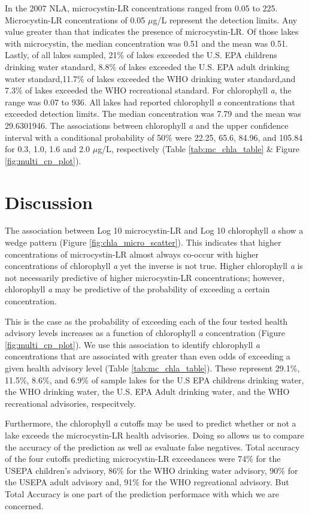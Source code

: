 \documentclass[11pt,]{article}
\begin{document}
In the 2007 NLA, microcystin-LR concentrations ranged from 0.05 to 225.
Microcystin-LR concentrations of 0.05 \(\mu\)g/L represent the detection
limits. Any value greater than that indicates the presence of
microcystin-LR. Of those lakes with microcystin, the median
concentration was 0.51 and the mean was 0.51. Lastly, of all lakes
sampled, 21\% of lakes exceeded the U.S. EPA childrens drinking water
standard, 8.8\% of lakes exceeded the U.S. EPA adult drinking water
standard,11.7\% of lakes exceeded the WHO drinking water standard,and
7.3\% of lakes exceeded the WHO recreational standard. For chlorophyll
\emph{a}, the range was 0.07 to 936. All lakes had reported chlorophyll
\emph{a} concentrations that exceeded detection limits. The median
concentration was 7.79 and the mean was 29.6301946. The associations
between chlorophyll \emph{a} and the upper confidence interval with a
conditional probability of 50\% were 22.25, 65.6, 84.96, and 105.84 for
0.3, 1.0, 1.6 and 2.0 \(\mu\)g/L, respectively (Table
\ref{tab:mc_chla_table} \& Figure \ref{fig:multi_cp_plot}).

\section{Discussion}\label{discussion}

The association between Log 10 microcystin-LR and Log 10 chlorophyll
\emph{a} show a wedge pattern (Figure \ref{fig:chla_micro_scatter}).
This indicates that higher concentrations of microcystin-LR almost
always co-occur with higher concentrations of chlorophyll \emph{a} yet
the inverse is not true. Higher chlorophyll \emph{a} is not necessarily
predictive of higher microcystin-LR concentrations; however, chlorophyll
\emph{a} may be predictive of the probability of exceeding a certain
concentration.

This is the case as the probability of exceeding each of the four tested
health advisory levels increases as a function of chlorophyll \emph{a}
concentration (Figure \ref{fig:multi_cp_plot}). We use this association
to identify chlorophyll \emph{a} concentrations that are associated with
greater than even odds of exceeding a given health advisory level (Table
\ref{tab:mc_chla_table}). These represent 29.1\%, 11.5\%, 8.6\%, and
6.9\% of sample lakes for the U.S EPA childrens drinking water, the WHO
drinking water, the U.S. EPA Adult drinking water, and the WHO
recreational advisories, respecitvely.

Furthermore, the chlorophyll \emph{a} cutoffs may be used to predict
whether or not a lake exceeds the microcystin-LR health advisories.
Doing so allows us to compare the accuracy of the prediction as well as
evaluate false negatives. Total accuracy of the four cutoffs predicting
microcystin-LR exceedances were 74\% for the USEPA children's advisory,
86\% for the WHO drinking water advisory, 90\% for the USEPA adult
advisory and, 91\% for the WHO regreational advisory. But Total Accuracy
is one part of the prediction performace with which we are concerned.
\end{document}

